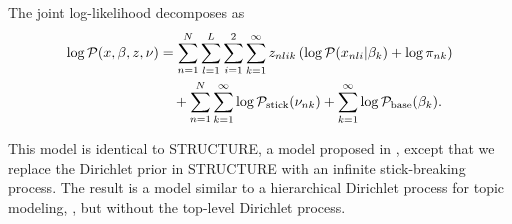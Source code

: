 \begin{ex}
The joint log-likelihood decomposes as
\begin{align*}
\log \mathcal{P}(x, \beta, z, \nu) &=
\sum_{n=1}^N \sum_{l=1}^L \sum_{i = 1}^2 \sum_{k=1}^{\infty}
        z_{nlik} \left(
            \log \mathcal{P}(x_{nli} \vert \beta_{k}) + \log \pi_{nk}
        \right)
\nonumber\\&
    \quad +
    \sum_{n=1}^N \sum_{k=1}^{\infty} \log \mathcal{P}_{\mathrm{stick}}(\nu_{nk})
    + \sum_{k=1}^{\infty} \log \mathcal{P}_{\mathrm{base}}(\beta_{k}).
\end{align*}

This model is identical to STRUCTURE,
a model proposed in \citet{pritchard:2000:structure, raj:2014:faststructure},
except that we replace the Dirichlet prior in STRUCTURE
with an infinite stick-breaking process.
The result is a model similar to a hierarchical Dirichlet process for topic modeling,
\citep{teh:2006:hdp},
but without the top-level Dirichlet process.
%
\end{ex}


